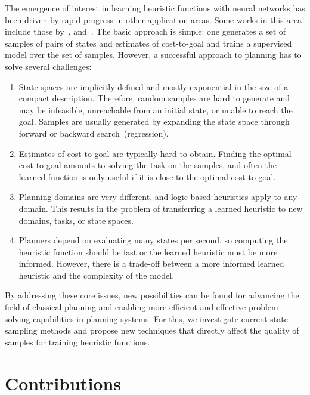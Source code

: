 The emergence of interest in learning heuristic functions with neural networks has been driven by rapid progress in other application areas. Some works in this area include those by~\citet{samadi2008learning,arfaee2011learning,agostinelli2019solving,yu2020learning,shen2020learning,ferber2020neural,toyer2020asnets,ferber2022neural}, and~\citet{otoole2022sampling}. The basic approach is simple: one generates a set of samples of pairs of states and estimates of cost-to-goal and trains a supervised model over the set of samples. However, a successful approach to planning has to solve several challenges:

\begin{enumerate}[label=C\arabic*),left=0pt]
    \itemsep0pt
    \item State spaces are implicitly defined and mostly exponential in the size of a compact description. Therefore, random samples are hard to generate and may be infeasible, unreachable from an initial state, or unable to reach the goal. Samples are usually generated by expanding the state space through forward or backward search~(regression).
    \item Estimates of cost-to-goal are typically hard to obtain. Finding the optimal cost-to-goal amounts to solving the task on the samples, and often the learned function is only useful if it is close to the optimal cost-to-goal.
    \item Planning domains are very different, and logic-based heuristics apply to any domain. This results in the problem of transferring a learned heuristic to new domains, tasks, or state spaces.
    \item Planners depend on evaluating many states per second, so computing the heuristic function should be fast or the learned heuristic must be more informed. However, there is a trade-off between a more informed learned heuristic and the complexity of the model.
\end{enumerate}

By addressing these core issues, new possibilities can be found for advancing the field of classical planning and enabling more efficient and effective problem-solving capabilities in planning systems. For this, we investigate current state sampling methods and propose new techniques that directly affect the quality of samples for training heuristic functions.

\section{Contributions}
\label{sec:contributions}

